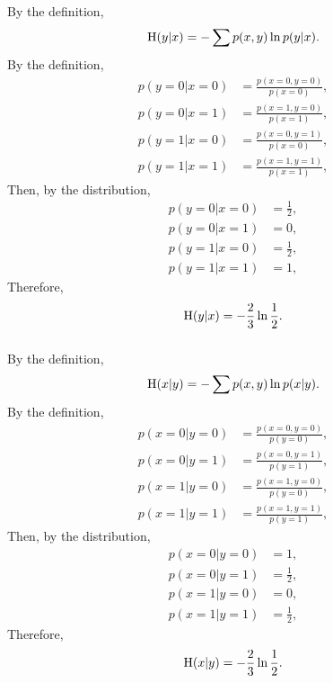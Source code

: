 \subsubsection{}
By the definition,
%
\begin{equation}
{\rm H}(y | x) = - \sum p(x, y) \ln p(y | x).
\end{equation}
%
By the definition,
%
\begin{equation}
\begin{aligned}
p(y = 0 | x = 0) &= \frac{p(x = 0, y = 0)}{p(x = 0)}, \\
p(y = 0 | x = 1) &= \frac{p(x = 1, y = 0)}{p(x = 1)}, \\
p(y = 1 | x = 0) &= \frac{p(x = 0, y = 1)}{p(x = 0)}, \\
p(y = 1 | x = 1) &= \frac{p(x = 1, y = 1)}{p(x = 1)},
\end{aligned}
\end{equation}
%
Then, by the distribution,
%
\begin{equation}
\begin{aligned}
p(y = 0 | x = 0) &= \frac{1}{2}, \\
p(y = 0 | x = 1) &= 0, \\
p(y = 1 | x = 0) &= \frac{1}{2}, \\
p(y = 1 | x = 1) &= 1,
\end{aligned}
\end{equation}
%
Therefore,
%
\begin{equation}
{\rm H}(y | x) = - \frac{2}{3} \ln \frac{1}{2}.
\end{equation}
%


\subsubsection{}
By the definition,
%
\begin{equation}
{\rm H}(x | y) = - \sum p(x, y) \ln p(x | y).
\end{equation}
%
By the definition,
%
\begin{equation}
\begin{aligned}
p(x = 0 | y = 0) &= \frac{p(x = 0, y = 0)}{p(y = 0)}, \\
p(x = 0 | y = 1) &= \frac{p(x = 0, y = 1)}{p(y = 1)}, \\
p(x = 1 | y = 0) &= \frac{p(x = 1, y = 0)}{p(y = 0)}, \\
p(x = 1 | y = 1) &= \frac{p(x = 1, y = 1)}{p(y = 1)},
\end{aligned}
\end{equation}
%
Then, by the distribution,
%
\begin{equation}
\begin{aligned}
p(x = 0 | y = 0) &= 1, \\
p(x = 0 | y = 1) &= \frac{1}{2}, \\
p(x = 1 | y = 0) &= 0, \\
p(x = 1 | y = 1) &= \frac{1}{2},
\end{aligned}
\end{equation}
%
Therefore,
%
\begin{equation}
{\rm H}(x | y) = - \frac{2}{3} \ln \frac{1}{2}.
\end{equation}
%


